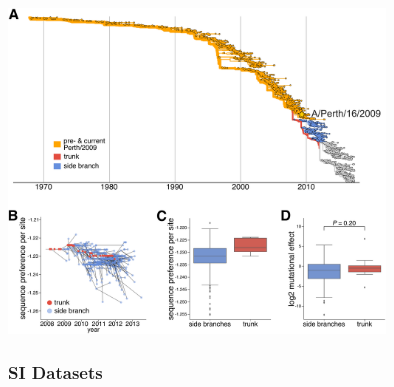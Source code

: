 \documentclass[9pt,twocolumn,twoside]{pnas-new}
\begin{document}
\begin{suppfigure}
\centerline{\includegraphics[width=0.75\textwidth]{figs/S04_post_Perth2009/post_Perth2009_seqpref.pdf}}
\caption{\label{suppfig:future}
{\bf The sequence preference of nodes that occur after the split of Perth/2009 off the trunk.}
Our experiments show a selective advantage for the trunk even if we limit the analysis to sequences that occur after the split of Perth/2009 off the trunk.
(A) Phylogenetic tree showing all nodes that branch from the trunk before or contemporaneously with Perth/2009 (orange), all nodes that occur after the branch to Perth/2009 for which we can resolve the trunk (red) or side branches (blue), and all nodes for which it is not yet clear which sequences will be on the trunk or side branches (gray).
In this figure, we restrict the analysis to the nodes in red and blue.
(B)  
Average per-site sequence preference (similar to Figure~\ref{fig:trunkvssidebranch}C) for all trunk and side-branch nodes that occur after the branch to Perth/2009.
(C)
The sequence preferences of nodes on the trunk generally exceed those of nodes on the side branches along the post-Perth/2009 portion of the tree.
(D)
Post-Perth/2009 trunk mutations on average tend to be more favorable than side-branch mutations.
Note that there are relatively few post-Perth/2009 mutations (13 trunk mutations and 324 side-branch mutations).
}
\end{suppfigure}

\clearpage

\subsubsection*{SI Datasets} 
\FloatBarrier
\end{document}
